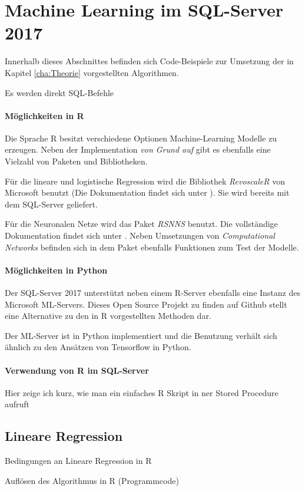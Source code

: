 \section{Machine Learning im SQL-Server 2017}
\label{sec:MLSQL} \label{sec:MachineLearning}
Innerhalb dieses Abschnittes befinden sich Code-Beispiele zur Umsetzung der in Kapitel \ref{cha:Theorie} vorgestellten Algorithmen. 

Es werden direkt SQL-Befehle 
\paragraph{Möglichkeiten in  R}
Die Sprache R besitzt verschiedene Optionen Machine-Learning Modelle zu erzeugen. Neben der Implementation \textit{von Grund auf} gibt es ebenfalls eine Vielzahl von Paketen und Bibliotheken. 

Für die lineare und logistische Regression wird die Bibliothek \textit{RevoscaleR} von Microsoft benutzt (Die Dokumentation findet sich unter \cite{RevoscaleR}). Sie wird bereits mit dem SQL-Server geliefert. 

Für die Neuronalen Netze wird das Paket \textit{RSNNS} benutzt. Die vollständige Dokumentation findet sich unter \cite{RSNNSDoku}. Neben Umsetzungen von \textit{Computational Networks} befinden sich in dem Paket ebenfalls Funktionen zum Test der Modelle.
\paragraph{Möglichkeiten in Python}
Der SQL-Server 2017 unterstützt neben einem R-Server ebenfalls eine Instanz des Microsoft ML-Servers. Dieses Open Source Projekt zu finden auf Github \cite{GithubMLServer} stellt eine Alternative zu den in R vorgestellten Methoden dar. 

Der ML-Server ist in Python implementiert und die Benutzung verhält sich ähnlich zu den Ansätzen von Tensorflow in Python. 

\paragraph{Verwendung von R im SQL-Server}
Hier zeige ich kurz, wie man ein einfaches R Skript in ner Stored Procedure aufruft
\subsection{Lineare Regression}
Bedingungen an Lineare Regression in R

Auflösen des Algorithmus in R (Programmcode)

